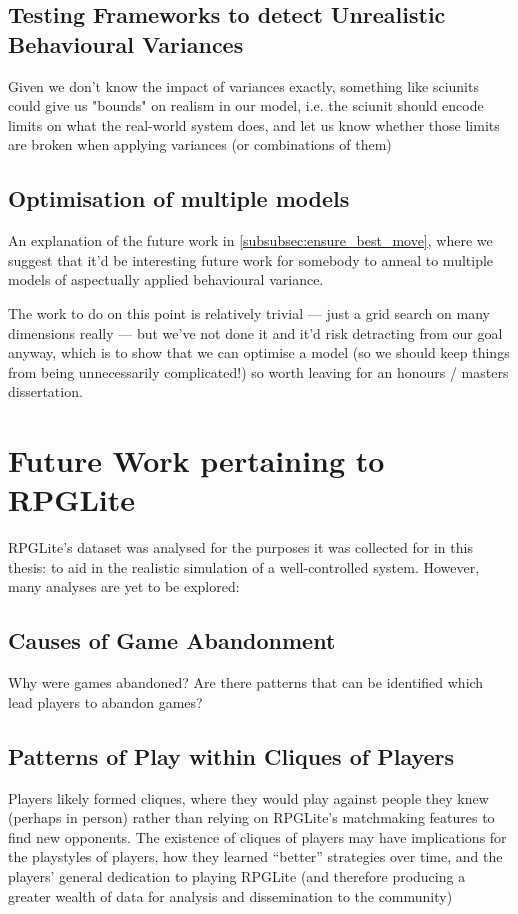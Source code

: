 \subsection{Testing Frameworks to detect Unrealistic Behavioural Variances}\label{sciunits_for_unrealistic_states}

Given we don't know the impact of variances exactly, something like sciunits
could give us "bounds" on realism in our model, i.e. the sciunit should encode
limits on what the real-world system does, and let us know whether those limits
are broken when applying variances (or combinations of them)


\subsection{Optimisation of multiple models}\label{many_aspectual_models_to_optimise}

An explanation of the future work in \cref{subsubsec:ensure_best_move}, where we
suggest that it'd be interesting future work for somebody to anneal to multiple
models of aspectually applied behavioural variance. 

The work to do on this point is relatively trivial --- just a grid search on
many dimensions really --- but we've not done it and it'd risk detracting from
our goal anyway, which is to show that we can optimise a model (so we should
keep things from being unnecessarily complicated!) so worth leaving for an
honours / masters dissertation.




\section{Future Work pertaining to RPGLite}\label{sec:future_work_rpglite}
RPGLite's dataset was analysed for the purposes it was collected for in this
thesis: to aid in the realistic simulation of a well-controlled \sociotechnical
system. However, many analyses are yet to be explored:

\subsection{Causes of Game Abandonment}
Why were games abandoned? Are there patterns that can be identified
which lead players to abandon games?
    
\subsection{Patterns of Play within Cliques of Players}
Players likely formed cliques, where they would play against people they knew
(perhaps in person) rather than relying on RPGLite's matchmaking features to
find new opponents. The existence of cliques of players may have implications
for the playstyles of players, how they learned ``better'' strategies over time,
and the players' general dedication to playing RPGLite (and therefore producing
a greater wealth of data for analysis and dissemination to the community)
    
